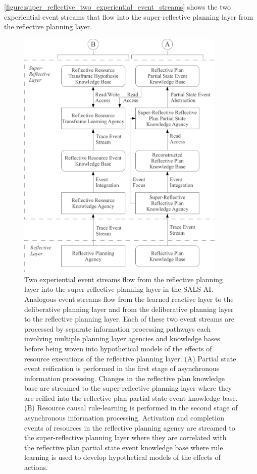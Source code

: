 {\mbox{\autoref{figure:super_reflective_two_experiential_event_streams}}}
shows the two experiential event streams that flow into the
super-reflective planning layer from the reflective planning layer.
\begin{figure}
\centering
\includegraphics[width=10cm]{gfx/super_reflective_two_experiential_event_streams}
\caption[Two experiential event streams flow from the reflective
  planning layer into the super-reflective planning layer in the SALS
  AI.]{Two experiential event streams flow from the reflective
  planning layer into the super-reflective planning layer in the SALS
  AI.  Analogous event streams flow from the learned reactive layer to
  the deliberative planning layer and from the deliberative planning
  layer to the reflective planning layer.  Each of these two event
  streams are processed by separate information processing pathways
  each involving multiple planning layer agencies and knowledge bases
  before being woven into hypothetical models of the effects of
  resource executions of the reflective planning layer.  (A) Partial
  state event reification is performed in the first stage of
  asynchronous information processing.  Changes in the reflective plan
  knowledge base are streamed to the super-reflective planning layer
  where they are reified into the reflective plan partial state event
  knowledge base.  (B) Resource causal rule-learning is performed in
  the second stage of asynchronous information processing.  Activation
  and completion events of resources in the reflective planning agency
  are streamed to the super-reflective planning layer where they are
  correlated with the reflective plan partial state event knowledge
  base where rule learning is used to develop hypothetical models of
  the effects of actions.}
\label{figure:super_reflective_two_experiential_event_streams}
\end{figure}
